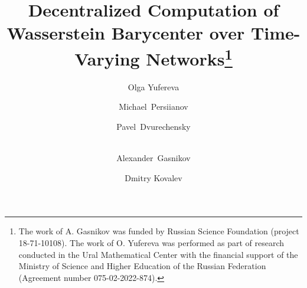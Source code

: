 %
%
%
%


%
%
\title{Decentralized Computation of Wasserstein Barycenter over Time-Varying Networks\thanks{The work of A. Gasnikov was funded by Russian Science Foundation (project 18-71-10108).  The work of O. Yufereva was performed as part of research conducted in the Ural Mathematical Center with the financial support of the Ministry of Science and Higher Education of the Russian Federation (Agreement number 075-02-2022-874).}}
%
%
\author{Olga Yufereva \and
Michael~Persiianov \and
Pavel~Dvurechensky \and \\
Alexander~Gasnikov \and
Dmitry Kovalev}
%
%
%

\maketitle              %

